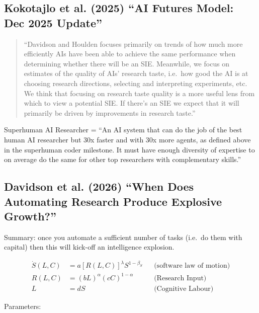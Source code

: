 \documentclass[
  11pt,
  letterpaper,
  DIV=11,
  numbers=noendperiod]{scrartcl}
\begin{document}
\subsection{Kokotajlo et al. (2025) ``AI Futures Model: Dec 2025
Update''}\label{kokotajlo2025aifuturesmodel-ai-futures-model-dec-2025-update}

\begin{quote}
``Davidson and Houlden focuses primarily on trends of how much more
efficiently AIs have been able to achieve the same performance when
determining whether there will be an SIE. Meanwhile, we focus on
estimates of the quality of AIs' research taste, i.e.~how good the AI is
at choosing research directions, selecting and interpreting experiments,
etc. We think that focusing on research taste quality is a more useful
lens from which to view a potential SIE. If there's an SIE we expect
that it will primarily be driven by improvements in research taste.''
\end{quote}

Superhuman AI Researcher = ``An AI system that can do the job of the
best human AI researcher but 30x faster and with 30x more agents, as
defined above in the superhuman coder milestone. It must have enough
diversity of expertise to on average do the same for other top
researchers with complementary skills.''

\subsection{Davidson et al. (2026) ``When Does Automating Research
Produce Explosive
Growth?''}\label{davidson2026automatingairesearch-when-does-automating-research-produce-explosive-growth}

Summary: once you automate a sufficient number of tasks (i.e.~do them
with capital) then this will kick-off an intelligence explosion.

\[\begin{aligned}
    \dot{S}(L,C) &= a [R(L,C)]^\lambda S^{1-\beta_S} && \text{(software law of motion)} \\
    R(L,C) &= (bL)^\alpha (cC)^{1-\alpha} && \text{(Research Input)} \\
    L &= dS && \text{(Cognitive Labour)}
\end{aligned}
\]

Parameters:
\end{document}
